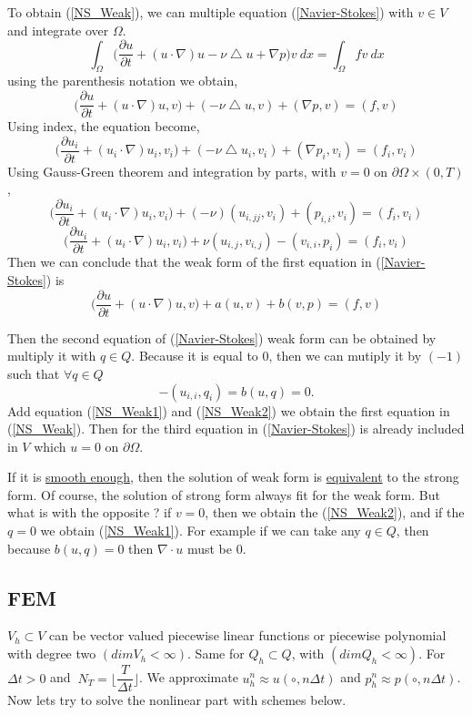 \documentclass[a4paper,10pt]{article}
\begin{document}
To obtain (\ref{NS_Weak}), we can multiple equation (\ref{Navier-Stokes}) with $ v \in V $ and integrate over $ \Omega $.
\[ \int_{\Omega} \big(\dfrac{\partial u}{\partial t} + (u \cdot \nabla) u - \nu \bigtriangleup u + \nabla p\big)v \ dx = \int_{\Omega} f v \ dx \]
using the parenthesis notation we obtain,
\[ \big(\dfrac{\partial u}{\partial t} + (u \cdot \nabla) u,v)+( - \nu \bigtriangleup u,v)+(\nabla p, v) = (f,v) \]
Using index, the equation become,
\[ \big(\dfrac{\partial u_{i}}{\partial t} + (u_{i} \cdot \nabla) u_{i},v_{i})+( - \nu \bigtriangleup u_{i},v_{i})+(\nabla p_{i}, v_{i}) = (f_{i},v_{i}) \]
Using Gauss-Green theorem and integration by parts, with $ v=0 $ on $ \partial\Omega \times (0,T) $,
\[ \big(\dfrac{\partial u_{i}}{\partial t} + (u_{i} \cdot \nabla) u_{i},v_{i})+(-\nu)(u_{i,jj},v_{i})+(p_{i,i}, v_{i}) = (f_{i},v_{i}) \]
\[ \big(\dfrac{\partial u_{i}}{\partial t} + (u_{i} \cdot \nabla) u_{i},v_{i})+\nu(u_{i,j},v_{i,j})-(v_{i,i}, p_{i}) = (f_{i},v_{i}) \]
Then we can conclude that the weak form of the first equation in (\ref{Navier-Stokes}) is
\begin{equation}\label{NS_Weak1}
 \big(\dfrac{\partial u}{\partial t} + (u \cdot \nabla) u,v)+a(u,v)+b(v,p) = (f,v)
\end{equation}

Then the second equation of (\ref{Navier-Stokes}) weak form can be obtained by multiply it with $ q \in Q $. Because it is equal to $ 0 $, then we can mutiply it by $ (-1) $ such that $ \forall q \in Q $
\begin{equation}\label{NS_Weak2}
 -(u_{i,i},q_{i}) = b(u,q) = 0.
\end{equation}
Add equation (\ref{NS_Weak1}) and (\ref{NS_Weak2}) we obtain the first equation in (\ref{NS_Weak}). Then for the third equation in (\ref{Navier-Stokes}) is already included in $ V $ which $ u=0 $ on $ \partial\Omega $.

If it is \underline{smooth enough}, then the solution of weak form is \underline{equivalent} to the strong form. Of course, the solution of strong form always fit for the weak form. But what is with the opposite ? if $ v=0 $, then we obtain the (\ref{NS_Weak2}), and if the $ q=0 $ we obtain (\ref{NS_Weak1}). For example if we can take any $ q\in Q $, then because $ b(u,q)=0 $ then $ \nabla \cdot u $ must be $ 0 $.

\subsection{FEM}
$ V_{h} \subset V $ can be vector valued piecewise linear functions or piecewise polynomial with degree two $ (dim V_{h}<\infty) $. Same for $ Q_{h} \subset Q $, with $ (dimQ_{h}<\infty) $. For $ \Delta t > 0 $ and $ \ N_{T} = \lfloor \dfrac{T}{\Delta t} \rfloor $. We approximate $ u_{h}^{n} \approx u(\circ,n\Delta t) $ and $ p_{h}^{n} \approx p(\circ,n\Delta t) $. Now lets try to solve the nonlinear part with schemes below.
\end{document}

